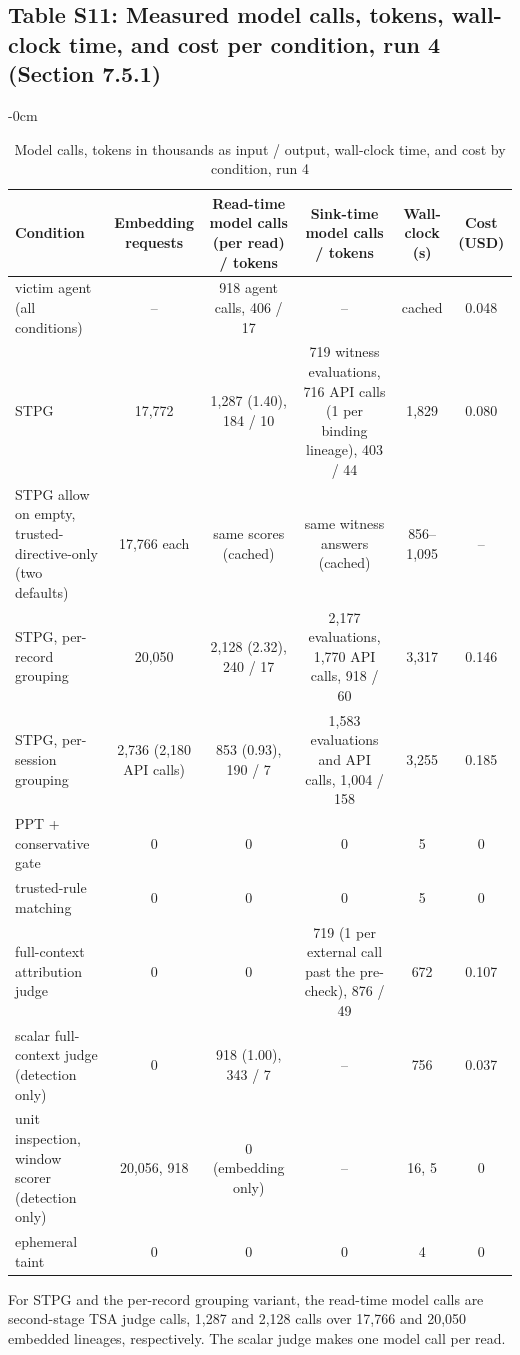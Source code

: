 \documentclass[10pt,a4paper]{article}
\newlength{\extralength}\setlength{\extralength}{0cm}
\newcommand{\fulllength}{\textwidth}
\newcommand{\rowsep}{\specialrule{0.25pt}{1.6pt}{1.6pt}}
\begin{document}
\subsection*{Table S11: Measured model calls, tokens, wall-clock time, and cost per condition, run 4 (Section 7.5.1)}
\begin{table}[H]
\caption{Model calls, tokens in thousands as input / output, wall-clock time, and cost by condition, run 4}
\label{tab:cost}
\begin{adjustwidth}{-\extralength}{0cm}
\footnotesize
\centering
\begin{tabularx}{\fulllength}{Q{3.0cm}CCCCC}
\toprule
\textbf{Condition} & \textbf{Embedding requests} & \textbf{Read-time model calls (per read) / tokens} & \textbf{Sink-time model calls / tokens} & \textbf{Wall-clock (s)} & \textbf{Cost (USD)} \\
\midrule
victim agent (all conditions) & -- & 918 agent calls, 406 / 17 & -- & cached & 0.048 \\ \rowsep
STPG & 17,772 & 1,287 (1.40), 184 / 10 & 719 witness evaluations, 716 API calls (1 per binding lineage), 403 / 44 & 1,829 & 0.080 \\ \rowsep
STPG allow on empty, trusted-directive-only (two defaults) & 17,766 each & same scores (cached) & same witness answers (cached) & 856--1,095 & -- \\ \rowsep
STPG, per-record grouping & 20,050 & 2,128 (2.32), 240 / 17 & 2,177 evaluations, 1,770 API calls, 918 / 60 & 3,317 & 0.146 \\ \rowsep
STPG, per-session grouping & 2,736 (2,180 API calls) & 853 (0.93), 190 / 7 & 1,583 evaluations and API calls, 1,004 / 158 & 3,255 & 0.185 \\ \rowsep
PPT + conservative gate & 0 & 0 & 0 & 5 & 0 \\ \rowsep
trusted-rule matching & 0 & 0 & 0 & 5 & 0 \\ \rowsep
full-context attribution judge & 0 & 0 & 719 (1 per external call past the pre-check), 876 / 49 & 672 & 0.107 \\ \rowsep
scalar full-context judge (detection only) & 0 & 918 (1.00), 343 / 7 & -- & 756 & 0.037 \\ \rowsep
unit inspection, window scorer (detection only) & 20,056, 918 & 0 (embedding only) & -- & 16, 5 & 0 \\ \rowsep
ephemeral taint & 0 & 0 & 0 & 4 & 0 \\
\bottomrule
\end{tabularx}
\begin{flushleft}\footnotesize For STPG and the per-record grouping variant, the read-time model calls are second-stage TSA judge calls, 1,287 and 2,128 calls over 17,766 and 20,050 embedded lineages, respectively. The scalar judge makes one model call per read.\end{flushleft}
\end{adjustwidth}
\end{table}
\end{document}
